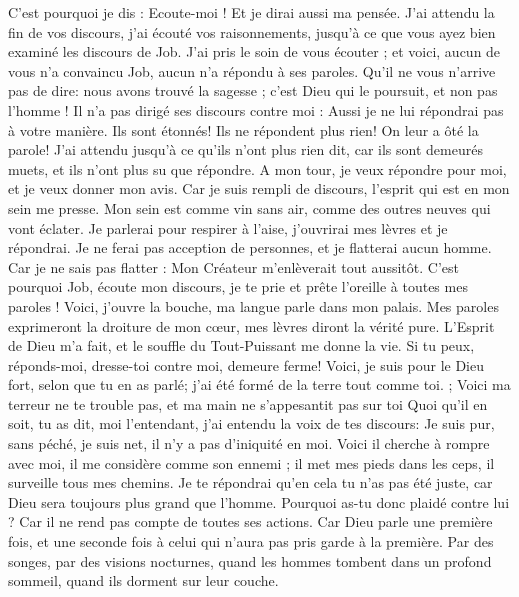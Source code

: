\begin{multicols}{2}
{C'est pourquoi je dis : Ecoute-moi ! Et je dirai aussi ma pensée.
J'ai attendu la fin de vos discours, j'ai écouté vos raisonnements, jusqu'à ce que vous ayez bien examiné les discours de Job.
J'ai pris le soin de vous écouter ; et voici, aucun de vous n'a convaincu Job, aucun n'a répondu à ses paroles.
Qu'il ne vous n'arrive pas de dire: nous avons trouvé la sagesse ; c'est Dieu qui le poursuit, et non pas l'homme !
Il n'a pas dirigé ses discours contre moi : Aussi je ne lui répondrai pas à votre manière.
Ils sont étonnés! Ils ne répondent plus rien! On leur a ôté la parole!
J'ai attendu jusqu'à ce qu'ils n'ont plus rien dit, car ils sont demeurés muets, et ils n'ont plus su que répondre.
A mon tour, je veux répondre pour moi, et je veux donner mon avis.
Car je suis rempli de discours, l'esprit qui est en mon sein me presse.
Mon sein est comme vin sans air, comme des outres neuves qui vont éclater.
Je parlerai pour respirer à l'aise, j'ouvrirai mes lèvres et je répondrai.
Je ne ferai pas acception de personnes, et je flatterai aucun homme.
Car je ne sais pas flatter : Mon Créateur m'enlèverait tout aussitôt.
\VerseOne{}C'est pourquoi Job, écoute mon discours, je te prie et prête l'oreille à toutes mes paroles !
Voici, j'ouvre la bouche, ma langue parle dans mon palais.
Mes paroles exprimeront la droiture de mon cœur, mes lèvres diront la vérité pure.
L'Esprit de Dieu m'a fait, et le souffle du Tout-Puissant me donne la vie.
Si tu peux, réponds-moi, dresse-toi contre moi, demeure ferme!
Voici, je suis pour le Dieu fort, selon que tu en as parlé; j'ai été formé de la terre tout comme toi. ;
Voici ma terreur ne te trouble pas, et ma main ne s'appesantit pas sur toi
Quoi qu'il en soit, tu as dit, moi l'entendant, j'ai entendu la voix de tes discours:
Je suis pur, sans péché, je suis net, il n'y a pas d'iniquité en moi.
Voici il cherche à rompre avec moi, il me considère comme son ennemi ;
il met mes pieds dans les ceps, il surveille tous mes chemins.
Je te répondrai qu'en cela tu n'as pas été juste, car Dieu sera toujours plus grand que l'homme.
Pourquoi as-tu donc plaidé contre lui ? Car il ne rend pas compte de toutes ses actions.
Car Dieu parle une première fois, et une seconde fois à celui qui n'aura pas pris garde à la première.
Par des songes, par des visions nocturnes, quand les hommes tombent dans un profond sommeil, quand ils dorment sur leur couche.
}
\end{multicols}
